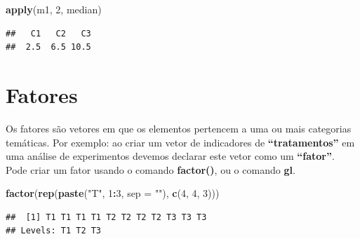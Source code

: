 \documentclass[
]{book}
\newenvironment{Shaded}{\begin{snugshade}}{\end{snugshade}}
\newcommand{\DataTypeTok}[1]{\textcolor[rgb]{0.13,0.29,0.53}{#1}}
\newcommand{\DecValTok}[1]{\textcolor[rgb]{0.00,0.00,0.81}{#1}}
\newcommand{\KeywordTok}[1]{\textcolor[rgb]{0.13,0.29,0.53}{\textbf{#1}}}
\newcommand{\NormalTok}[1]{#1}
\newcommand{\OperatorTok}[1]{\textcolor[rgb]{0.81,0.36,0.00}{\textbf{#1}}}
\newcommand{\StringTok}[1]{\textcolor[rgb]{0.31,0.60,0.02}{#1}}
\begin{document}
\begin{Shaded}
\begin{Highlighting}[]
 \KeywordTok{apply}\NormalTok{(m1, }\DecValTok{2}\NormalTok{, median)}
\end{Highlighting}
\end{Shaded}

\begin{verbatim}
##   C1   C2   C3 
##  2.5  6.5 10.5
\end{verbatim}

\hypertarget{fatores}{%
\section{Fatores}\label{fatores}}

Os fatores são vetores em que os elementos pertencem a uma ou mais categorias temáticas. Por exemplo: ao criar um vetor de indicadores de \textbf{``tratamentos''} em uma análise de experimentos devemos declarar este vetor como um \textbf{``fator''}.
Pode criar um fator usando o comando \textbf{factor()}, ou o comando \textbf{gl}.

\begin{Shaded}
\begin{Highlighting}[]
\KeywordTok{factor}\NormalTok{(}\KeywordTok{rep}\NormalTok{(}\KeywordTok{paste}\NormalTok{(}\StringTok{"T"}\NormalTok{, }\DecValTok{1}\OperatorTok{:}\DecValTok{3}\NormalTok{, }\DataTypeTok{sep =} \StringTok{""}\NormalTok{), }\KeywordTok{c}\NormalTok{(}\DecValTok{4}\NormalTok{, }\DecValTok{4}\NormalTok{, }\DecValTok{3}\NormalTok{)))}
\end{Highlighting}
\end{Shaded}

\begin{verbatim}
##  [1] T1 T1 T1 T1 T2 T2 T2 T2 T3 T3 T3
## Levels: T1 T2 T3
\end{verbatim}
\end{document}

